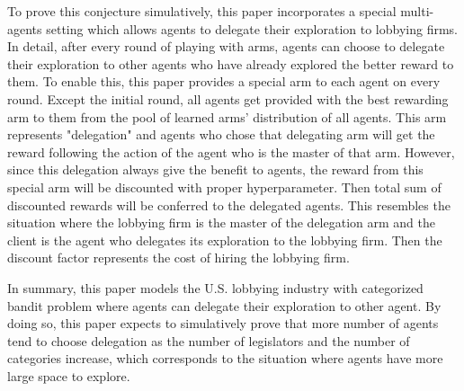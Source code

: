 \documentclass{article}
\begin{document}
To prove this conjecture simulatively, this paper incorporates a special multi-agents setting which allows agents to delegate their exploration to lobbying firms. In detail, after every round of playing with arms, 
agents can choose to delegate their exploration to other agents who have already explored the better reward to them. 
To enable this, 
this paper provides a special arm to each agent on every round. Except the initial round, all agents get provided with the best rewarding arm to them from the pool of learned arms' distribution of all agents. 
This arm represents "delegation" and agents who chose that delegating arm will get the reward following the action of the agent who is the master of that arm. However, since this delegation always give the benefit to agents,
the reward from this special arm will be discounted with proper hyperparameter. Then total sum of discounted rewards will be conferred to the delegated agents. This resembles the situation where the lobbying firm is the master of the delegation arm and the client is the agent who delegates its exploration to the lobbying firm. Then the discount factor represents the cost of hiring the lobbying firm. 



In summary, this paper models the U.S. lobbying industry with categorized bandit problem where agents can delegate their exploration to other agent. By doing so, 
this paper expects to simulatively prove that more number of agents tend to choose delegation as the number of legislators and the number of categories increase, which corresponds to the situation where agents have more large space to explore. 





\end{document}
